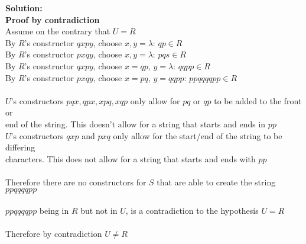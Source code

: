 \documentclass[11pt]{article}
\begin{document}
\begin{enumerate}
\begin{solution}
{\bf Solution:}\\
{\bf Proof by contradiction }\\
\null\quad Assume on the contrary that $U=R$\\
\null\quad By $R$'s constructor $qxpy$, choose $x,y=\lambda$: $qp\in R$\\
\null\quad By $R$'s constructor $pxqy$, choose $x,y=\lambda$: $pqs\in R$\\
\null\quad By $R$'s constructor $qxpy$, choose $x=qp$, $y=\lambda$: $qqpp\in R$ \\
\null\quad By $R$'s constructor $pxqy$, choose $x=pq$, $y=qqpp$: $ppqqqqpp\in R$ \\\\
\null\quad $U$'s constructors $pqx,qpx,xpq,xqp$ only allow for $pq$ or $qp$ to be added to the front or\\
\null\quad end of the string. This doesn't allow for a string that starts and ends in $pp$ \\
\null\quad $U$'s constructors $qxp$ and $pxq$ only allow for the start/end of the string to be differing \\
\null\quad characters. This does not allow for a string that starts and ends with $pp$\\\\
\null\quad Therefore there are no constructors for $S$ that are able to create the string $ppqqqqpp$ \\\\
\null\quad $ppqqqqpp$ being in $R$ but not in $U$, is a contradiction to the hypothesis $U=R$ \\\\
Therefore by contradiction $U\not = R$


\end{solution}
\end{enumerate}
\end{document}
